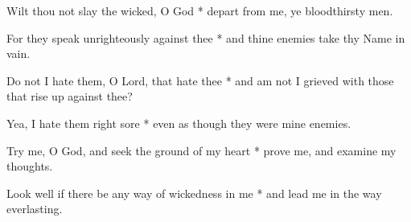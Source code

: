 \begin{multicols}{2}
	Wilt thou not slay the wicked, O God * depart from me, ye bloodthirsty men.
	
	For they speak unrighteously against thee * and thine enemies take thy Name in vain.
	
	Do not I hate them, O Lord, that hate thee * and am not I grieved with those that rise up against thee?
	
	Yea, I hate them right sore * even as though they were mine enemies.
	
	Try me, O God, and seek the ground of my heart * prove me, and examine my thoughts.
	
	Look well if there be any way of wickedness in me * and lead me in the way everlasting.
	
	\gloria{}
\end{multicols}